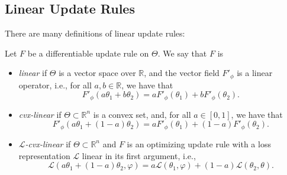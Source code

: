 %
%

%
%
\subsection{Linear Update Rules}


There are many definitions of linear update rules:
\begin{defn}\label{ax:linear}
Let $F$ be a differentiable update rule on $\Theta$. We say that $F$ is \textellipsis
\begin{itemize}
\item \emph{linear} if $\Theta$ is a vector space over $\mathbb R$, and the
vector field $F'_\phi$ is a linear operator, i.e., for all $a, b \in \mathbb R$, we have that
\[ F'_\phi(a \theta_1 + b \theta_2) = a F'_\phi(\theta_1) + b F'_\phi(\theta_2). \]

\item \emph{cvx-linear} if $\Theta \subset \mathbb R^n$ is a convex set, and, for all $a \in [0,1]$, we have that
\[ F'_\phi(a \theta_1 + (1-a) \theta_2) = a F'_\phi(\theta_1) + (1-a) F'_\phi(\theta_2). \]

\item \emph{$\mathcal L$-cvx-linear} if $\Theta \subset \mathbb R^n$ and $F$ is an optimizing update rule with a loss representation $\mathcal L$ linear in its first argument, i.e.,
\[
    \mathcal L(a \theta_1 + (1-a) \theta_2, \varphi) = a \mathcal L(\theta_1, \varphi) + (1-a) \mathcal L(\theta_2, \theta).
\]
\end{itemize}
\end{defn}

